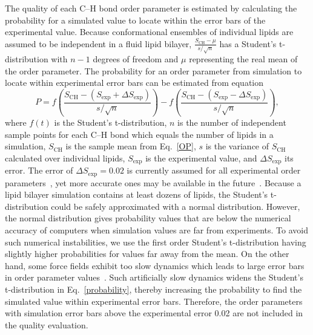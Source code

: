 \documentclass[fleqn,10pt]{wlscirep}
\begin{document}
The quality of each C--H bond order parameter is estimated by calculating the probability for a simulated value to locate within the error bars of the experimental value. Because conformational ensembles of individual lipids are assumed to be independent in a fluid lipid bilayer, $\frac{S_\mathrm{CH}-\mu}{s/\sqrt{n}}$ has a Student's t-distribution with $n-1$ degrees of freedom and $\mu$ representing the real mean of the order parameter. The probability for an order parameter from simulation to locate within experimental error bars can be estimated from equation
\begin{equation}\label{probability}
  P = f \left( \frac{S_\mathrm{CH} - (S_\mathrm{exp}+\Delta S_\mathrm{exp})}{s/\sqrt{n}} \right) - f \left( \frac{S_\mathrm{CH} - (S_\mathrm{exp}-\Delta S_\mathrm{exp})}{s/\sqrt{n}} \right),
\end{equation}
where $f(t)$ is the %
Student's t-distribution, $n$ is the number of independent sample points for each C--H bond which equals the number of lipids in a simulation, $S_\mathrm{CH}$ is the sample mean from Eq.~\ref{OP}, $s$ is the variance of $S_\mathrm {CH}$ calculated over individual lipids, $S_\mathrm{exp}$ is the experimental value, and $\Delta S_\mathrm{exp}$ its error. The error of $\Delta S_\mathrm{exp} = 0.02$ is currently assumed for all experimental order parameters~\cite{ollila16}, yet more accurate ones may be available in the future~\cite{wurl22}. Because a lipid bilayer simulation contains at least dozens of lipids, the Student's t-distribution could be safely approximated with a normal distribution. However, the normal distribution gives probability values that are below the numerical accuracy of computers when simulation values are far from experiments. To avoid such numerical instabilities, we use the first order Student's t-distribution having slightly higher probabilities for values far away from the mean. On the other hand, some force fields exhibit too slow dynamics which leads to large error bars in order parameter values~\cite{antila21a}. Such artificially slow dynamics widens the Student's t-distribution in Eq.~\ref{probability}, thereby increasing the probability to find the simulated value within experimental error bars. Therefore, the order parameters with simulation error bars above the experimental error 0.02 are not included in the quality evaluation.
\end{document}
